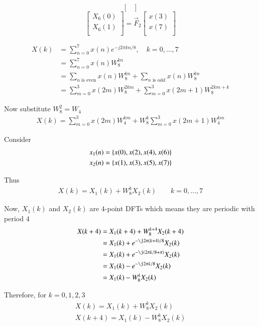 \documentclass[journal,12pt,twocolumn]{IEEEtran}
\renewcommand\thesection{\arabic{section}}
\begin{document}
\begin{enumerate}[label=\thesection.\arabic*]
\begin{equation}
\begin{bmatrix}
\end{bmatrix}
\end{equation}
\begin{equation}
\begin{bmatrix}
X_{6}(0) \\ 
X_{6}(1)\\ 
\end{bmatrix}
= \vec{F}_{2}
\begin{bmatrix}
x(3) \\ 
x(7) \\ 
\end{bmatrix}
\end{equation}

\solution 
\begin{align}
	X(k) &= \sum_{n=0}^7 x(n) e^{-j 2 \pi k n / 8}, \quad k=0, \ldots, 7\\
	&= \sum_{n=0}^7 x(n) W_8^{kn} \\
	&= \sum_{n \text{ is even}}x(n) W_8^{kn} + \sum_{n \text{ is odd}}x(n) W_8^{kn} \\
	&= \sum_{m=0}^3 x(2m) W_8^{2km} + \sum_{m=0}^3 x(2m+1) W_8^{2km + k}
\end{align}	

Now substitute $W_8^2 = W_4$
\begin{align}
		X(k) = \sum_{m=0}^3 x(2m) W_4^{km} + W_8^k \sum_{m=0}^3 x(2m+1) W_4^{km}
\end{align}

Consider
\begin{align}
		x_1(n) = \left\{x(0), x(2), x(4), x(6)\right\} \\
		x_2(n) = \left\{x(1), x(3), x(5), x(7)\right\}
\end{align}

Thus
\begin{align}
		X(k) = X_1(k) + W_8^k X_2(k) \qquad k = 0,\ldots,7
\end{align}

Now, $X_1(k)$ and $X_2(k)$ are $4$-point DFTs which means they are periodic with period $4$
\begin{align}
		X(k+4) &= X_1(k+4) + W_8^{k+4} X_2(k+4) \\
		&= X_1(k) + e^{-\j 2\pi(k+4)/8} X_2(k) \\
		&= X_1(k) + e^{-\j (2\pi k/8 + \pi)} X_2(k) \\
		&= X_1(k) - e^{-\j 2\pi k/8 } X_2(k) \\
		&= X_1(k) - W_8^k X_2(k)
\end{align}

Therefore, for $k=0,1,2,3$
\begin{align}
		X(k) = X_1(k) + W_8^k X_2(k)  \\
		X(k+4) = X_1(k) - W_8^k X_2(k) 
\end{align}


\end{enumerate}
\end{document}

